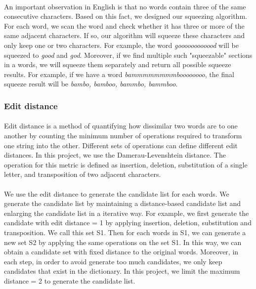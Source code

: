 \documentclass[twocolumn,10pt]{article}
\begin{document}
\paragraph{} An important observation in English is that no words contain three of the same consecutive characters. Based on this fact, we designed our squeezing algorithm. For each word, we scan the word and check whether it has three or more of the same adjacent characters. If so, our algorithm will squeeze these characters and only keep one or two characters. For example, the word \textit{goooooooooood} will be squeezed to \textit{good} and \textit{god}. Moreover, if we find multiple such "squeezable" sections in a words, we will squeeze them separately and return all possible squeeze results. For example, if we have a word \textit{bammmmmmmmboooooooo}, the final squeeze result will be \textit{bambo, bamboo, bammbo, bammboo}.
\subsubsection*{Edit distance}
\paragraph{} Edit distance is a method of quantifying how dissimilar two words are to one another by counting the minimum number of operations required to transform one string into the other. Different sets of operations can define different edit distances. In this project, we use the Damerau-Levenshtein distance. The operation for this metric is defined as insertion, deletion, substitution of a single letter, and transposition of two adjacent characters. 
\paragraph{}We use the edit distance to generate the candidate list for each words. We generate the candidate list by maintaining a distance-based candidate list and enlarging the candidate list in a iterative way. For example, we first generate the candidate with edit distance = 1 by applying insertion, deletion, substitution and transposition. We call this set S1. Then for each words in S1, we can generate a new set S2 by applying the same operations on the set S1. In this way, we can obtain a candidate set with fixed distance to the original words. Moreover, in each step, in order to avoid generate too much candidates, we only keep candidates that exist in the dictionary. In this project, we limit the maximum distance = 2 to generate the candidate list.
\end{document}
